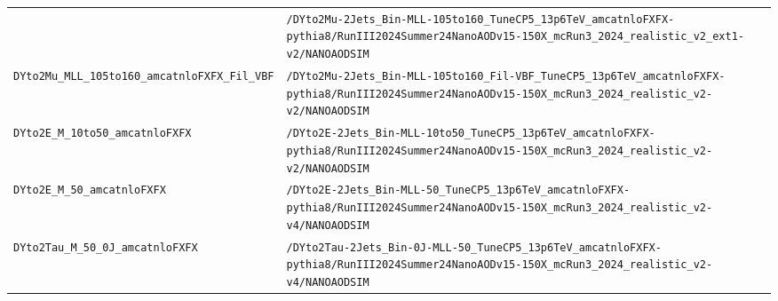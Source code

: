 \begin{longtable}{@{}>{\RaggedRight\arraybackslash}p{} >{\RaggedRight\arraybackslash}p{}@{}}
 & \texttt{/\allowbreak{}DYto2Mu-\allowbreak{}2Jets\_\allowbreak{}Bin-\allowbreak{}MLL-\allowbreak{}105to160\_\allowbreak{}TuneCP5\_\allowbreak{}13p6TeV\_\allowbreak{}amcatnloFXFX-\allowbreak{}pythia8/\allowbreak{}RunIII2024Summer24NanoAODv15-\allowbreak{}150X\_\allowbreak{}mcRun3\_\allowbreak{}2024\_\allowbreak{}realistic\_\allowbreak{}v2\_\allowbreak{}ext1-\allowbreak{}v2/\allowbreak{}NANOAODSIM} \\
\addlinespace[2pt]
\texttt{DYto2Mu\_\allowbreak{}MLL\_\allowbreak{}105to160\_\allowbreak{}amcatnloFXFX\_\allowbreak{}Fil\_\allowbreak{}VBF} & \texttt{/\allowbreak{}DYto2Mu-\allowbreak{}2Jets\_\allowbreak{}Bin-\allowbreak{}MLL-\allowbreak{}105to160\_\allowbreak{}Fil-\allowbreak{}VBF\_\allowbreak{}TuneCP5\_\allowbreak{}13p6TeV\_\allowbreak{}amcatnloFXFX-\allowbreak{}pythia8/\allowbreak{}RunIII2024Summer24NanoAODv15-\allowbreak{}150X\_\allowbreak{}mcRun3\_\allowbreak{}2024\_\allowbreak{}realistic\_\allowbreak{}v2-\allowbreak{}v2/\allowbreak{}NANOAODSIM} \\
\addlinespace[2pt]
\texttt{DYto2E\_\allowbreak{}M\_\allowbreak{}10to50\_\allowbreak{}amcatnloFXFX} & \texttt{/\allowbreak{}DYto2E-\allowbreak{}2Jets\_\allowbreak{}Bin-\allowbreak{}MLL-\allowbreak{}10to50\_\allowbreak{}TuneCP5\_\allowbreak{}13p6TeV\_\allowbreak{}amcatnloFXFX-\allowbreak{}pythia8/\allowbreak{}RunIII2024Summer24NanoAODv15-\allowbreak{}150X\_\allowbreak{}mcRun3\_\allowbreak{}2024\_\allowbreak{}realistic\_\allowbreak{}v2-\allowbreak{}v2/\allowbreak{}NANOAODSIM} \\
\addlinespace[2pt]
\texttt{DYto2E\_\allowbreak{}M\_\allowbreak{}50\_\allowbreak{}amcatnloFXFX} & \texttt{/\allowbreak{}DYto2E-\allowbreak{}2Jets\_\allowbreak{}Bin-\allowbreak{}MLL-\allowbreak{}50\_\allowbreak{}TuneCP5\_\allowbreak{}13p6TeV\_\allowbreak{}amcatnloFXFX-\allowbreak{}pythia8/\allowbreak{}RunIII2024Summer24NanoAODv15-\allowbreak{}150X\_\allowbreak{}mcRun3\_\allowbreak{}2024\_\allowbreak{}realistic\_\allowbreak{}v2-\allowbreak{}v4/\allowbreak{}NANOAODSIM} \\
\addlinespace[2pt]
\texttt{DYto2Tau\_\allowbreak{}M\_\allowbreak{}50\_\allowbreak{}0J\_\allowbreak{}amcatnloFXFX} & \texttt{/\allowbreak{}DYto2Tau-\allowbreak{}2Jets\_\allowbreak{}Bin-\allowbreak{}0J-\allowbreak{}MLL-\allowbreak{}50\_\allowbreak{}TuneCP5\_\allowbreak{}13p6TeV\_\allowbreak{}amcatnloFXFX-\allowbreak{}pythia8/\allowbreak{}RunIII2024Summer24NanoAODv15-\allowbreak{}150X\_\allowbreak{}mcRun3\_\allowbreak{}2024\_\allowbreak{}realistic\_\allowbreak{}v2-\allowbreak{}v4/\allowbreak{}NANOAODSIM} \\

\end{longtable}
